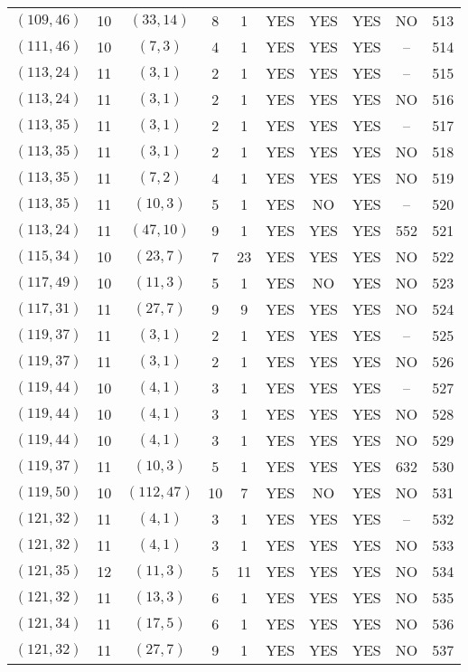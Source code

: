 \begin{longtable}{|c|c|c|c|c|c|c|c|c|c|}
$(109, 46)$ & 10 & $(33, 14)$ & 8 & 1 & YES & YES & YES & NO & 513\\
$(111, 46)$ & 10 & $(7, 3)$ & 4 & 1 & YES & YES & YES & -- & 514\\
$(113, 24)$ & 11 & $(3, 1)$ & 2 & 1 & YES & YES & YES & -- & 515\\
$(113, 24)$ & 11 & $(3, 1)$ & 2 & 1 & YES & YES & YES & NO & 516\\
$(113, 35)$ & 11 & $(3, 1)$ & 2 & 1 & YES & YES & YES & -- & 517\\
$(113, 35)$ & 11 & $(3, 1)$ & 2 & 1 & YES & YES & YES & NO & 518\\
$(113, 35)$ & 11 & $(7, 2)$ & 4 & 1 & YES & YES & YES & NO & 519\\
$(113, 35)$ & 11 & $(10, 3)$ & 5 & 1 & YES & NO & YES & -- & 520\\
$(113, 24)$ & 11 & $(47, 10)$ & 9 & 1 & YES & YES & YES & 552 & 521\\
$(115, 34)$ & 10 & $(23, 7)$ & 7 & 23 & YES & YES & YES & NO & 522\\
$(117, 49)$ & 10 & $(11, 3)$ & 5 & 1 & YES & NO & YES & NO & 523\\
$(117, 31)$ & 11 & $(27, 7)$ & 9 & 9 & YES & YES & YES & NO & 524\\
$(119, 37)$ & 11 & $(3, 1)$ & 2 & 1 & YES & YES & YES & -- & 525\\
$(119, 37)$ & 11 & $(3, 1)$ & 2 & 1 & YES & YES & YES & NO & 526\\
$(119, 44)$ & 10 & $(4, 1)$ & 3 & 1 & YES & YES & YES & -- & 527\\
$(119, 44)$ & 10 & $(4, 1)$ & 3 & 1 & YES & YES & YES & NO & 528\\
$(119, 44)$ & 10 & $(4, 1)$ & 3 & 1 & YES & YES & YES & NO & 529\\
$(119, 37)$ & 11 & $(10, 3)$ & 5 & 1 & YES & YES & YES & 632 & 530\\
$(119, 50)$ & 10 & $(112, 47)$ & 10 & 7 & YES & NO & YES & NO & 531\\
$(121, 32)$ & 11 & $(4, 1)$ & 3 & 1 & YES & YES & YES & -- & 532\\
$(121, 32)$ & 11 & $(4, 1)$ & 3 & 1 & YES & YES & YES & NO & 533\\
$(121, 35)$ & 12 & $(11, 3)$ & 5 & 11 & YES & YES & YES & NO & 534\\
$(121, 32)$ & 11 & $(13, 3)$ & 6 & 1 & YES & YES & YES & NO & 535\\
$(121, 34)$ & 11 & $(17, 5)$ & 6 & 1 & YES & YES & YES & NO & 536\\
$(121, 32)$ & 11 & $(27, 7)$ & 9 & 1 & YES & YES & YES & NO & 537\\

\end{longtable}
